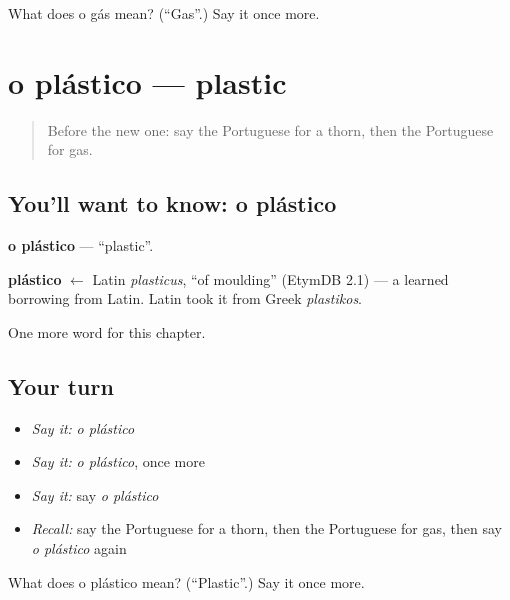 \begin{tcolorbox}[breakable,colback=teal!4,colframe=teal!35!black,title={Before you move on}]
What does o gás mean? (\textquotedblleft{}Gas\textquotedblright{}.) Say it once more.
\end{tcolorbox}
\section[o plástico]{o plástico — plastic}

\label{lesson:PT-C251-plastico}



\begin{quote}
Before the new one: say the Portuguese for a thorn, then the Portuguese for gas.
\end{quote}

\subsection*{You'll want to know: o plástico}
\textbf{o plástico} — \textquotedblleft{}plastic\textquotedblright{}.

\begin{cousinweb}
\textbf{plástico} $\leftarrow$ Latin \emph{plasticus}, \textquotedblleft{}of moulding\textquotedblright{} (EtymDB 2.1) — a learned borrowing from Latin. Latin took it from Greek \emph{plastikos}.
\end{cousinweb}

\begin{grammarlens}[title={What you've built}]
One more word for this chapter.
\end{grammarlens}

\subsection*{Your turn}
\begin{itemize}
\raggedright
  \item \emph{Say it:} \emph{o plástico}
  \item \emph{Say it:} \emph{o plástico}, once more
  \item \emph{Say it:} say \emph{o plástico}
  \item \emph{Recall:} say the Portuguese for a thorn, then the Portuguese for gas, then say \emph{o plástico} again
\end{itemize}

\begin{tcolorbox}[breakable,colback=teal!4,colframe=teal!35!black,title={Before you move on}]
What does o plástico mean? (\textquotedblleft{}Plastic\textquotedblright{}.) Say it once more.
\end{tcolorbox}

